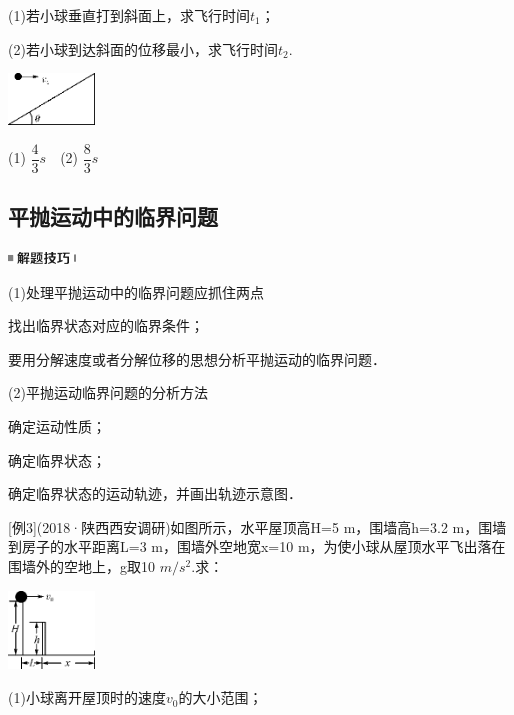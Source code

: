 \documentclass[cn,10.5pt,chinese,mac,chinesefont=founder]{elegantbook}
\begin{document}
(1)若小球垂直打到斜面上，求飞行时间$t_1$；

(2)若小球到达斜面的位移最小，求飞行时间$t_2$.

\begin{center}\includegraphics[width=0.90625in,height=0.54167in]{media/image166.png}\end{center}
\begin{solution}
	(1) $\dfrac{4}{3}s$　(2) $\dfrac{8}{3}s$
\end{solution}
\newpage
\subsection{平抛运动中的临界问题}

\begin{center}\includegraphics[width=0.70833in,height=0.125in]{media/image37.png}\end{center}

(1)处理平抛运动中的临界问题应抓住两点

找出临界状态对应的临界条件；

要用分解速度或者分解位移的思想分析平抛运动的临界问题．

(2)平抛运动临界问题的分析方法

确定运动性质；

确定临界状态；

确定临界状态的运动轨迹，并画出轨迹示意图．

{[}例3{]}(2018·陕西西安调研)如图所示，水平屋顶高H=5 m，围墙高h=3.2
m，围墙到房子的水平距离L=3 m，围墙外空地宽x=10
m，为使小球从屋顶水平飞出落在围墙外的空地上，g取10 $m/s^2$.求：

\begin{center}\includegraphics[width=0.90625in,height=0.82292in]{media/image169.png}\end{center}

(1)小球离开屋顶时的速度$v_0$的大小范围；
\end{document}
